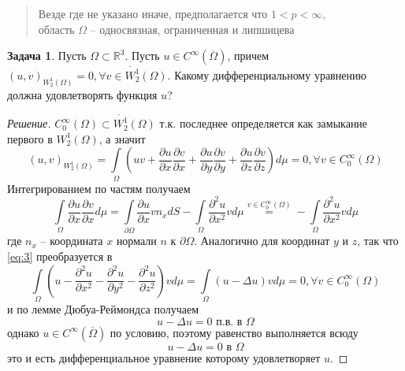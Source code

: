 \documentclass[12pt,a4paper]{article}
\theoremstyle{definition}
\newtheorem{exercise}{Задача}
\newenvironment{solution}
{\renewcommand\qedsymbol{$\blacksquare$}\begin{proof}[Решение]}
{\end{proof}}
\newcommand{\Real}{\mathbb{R}}
\begin{document}
\begin{abstract}
	Везде где не указано иначе, предполагается что $1 < p < \infty$, \\ область $\Omega$ -- односвязная, ограниченная и липшицева
\end{abstract}

\addtocounter{exercise}{1}

\begin{exercise}
	Пусть $\Omega \subset \Real^3$. Пусть $u \in C^\infty (\overline{\Omega})$, причем $(u, v)_{W_2^1 (\Omega)} = 0, \forall v \in \mathring{W_2^1} (\Omega)$. Какому дифференциальному уравнению должна удовлетворять функция $u$?
\end{exercise}
\begin{solution}
	$C_0^\infty (\Omega) \subset \mathring{W_2^1} (\Omega)$ т.к. последнее определяется как замыкание первого в $W_2^1 (\Omega)$, а значит
	\begin{equation}\label{eq:3}
		(u, v)_{W_2^1 (\Omega)} = \int\limits_{\Omega}{\left(u v + \frac{\partial u}{\partial x} \frac{\partial v}{\partial x} + \frac{\partial u}{\partial y} \frac{\partial v}{\partial y} +  \frac{\partial u}{\partial z} \frac{\partial v}{\partial z}\right) d\mu} = 0, \forall v \in C_0^\infty (\Omega)
	\end{equation}
Интегрированием по частям получаем
\begin{equation*}
	\int\limits_{\Omega}{\frac{\partial u}{\partial x} \frac{\partial v}{\partial x} d\mu} = \int\limits_{\partial \Omega}{\frac{\partial u}{\partial x} v n_x dS} - \int\limits_{\Omega}{\frac{\partial^2 u}{\partial x^2} v d\mu} \overset{v \in C_0^\infty (\Omega)}{=} -\int\limits_{\Omega}{\frac{\partial^2 u}{\partial x^2} v d\mu}
\end{equation*}
где $n_x$ -- координата $x$ нормали $n$ к $\partial \Omega$. Аналогично для координат $y$ и $z$, так что \eqref{eq:3} преобразуется в 
\begin{equation*}
	\int\limits_{\Omega}{\left( u - \frac{\partial^2 u}{\partial x^2} - \frac{\partial^2 u}{\partial y^2} - \frac{\partial^2 u}{\partial z^2}\right)v d\mu} = \int\limits_{\Omega}{(u - \Delta u)v d\mu} = 0, \forall v \in C_0^\infty (\Omega)
\end{equation*}
и по лемме Дюбуа-Реймондса получаем
\begin{equation*}
	u - \Delta u = 0 \text{ п.в. в } \Omega
\end{equation*}
однако $u \in C^\infty (\overline{\Omega})$ по условию, поэтому равенство выполняется всюду
\begin{equation*}
	u - \Delta u = 0 \text{ в } \Omega
\end{equation*} 
это и есть дифференциальное уравнение которому удовлетворяет $u$.
\end{solution}
\newpage
\end{document}
